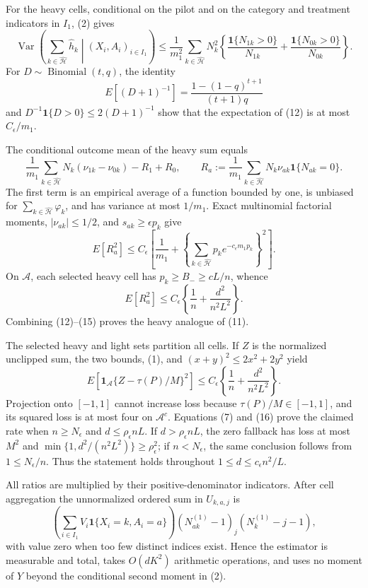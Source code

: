 For the heavy cells, conditional on the pilot and on the category and treatment indicators in \(I_1\), (2) gives
\[
 \operatorname{Var}\left(\sum_{k\in\widehat{\mathcal H}}\widehat h_k
 \middle|(X_i,A_i)_{i\in I_1}\right)
 \le\frac1{m_1^2}\sum_{k\in\widehat{\mathcal H}}N_k^2
 \left\{\frac{\mathbf1\{N_{1k}>0\}}{N_{1k}}+
 \frac{\mathbf1\{N_{0k}>0\}}{N_{0k}}\right\}.
\tag{12}
\]
For \(D\sim\operatorname{Binomial}(t,q)\), the identity
\[
 E[(D+1)^{-1}]=\frac{1-(1-q)^{t+1}}{(t+1)q}
\]
and \(D^{-1}\mathbf1\{D>0\}\le2(D+1)^{-1}\) show that the expectation of (12) is at most \(C_\epsilon/m_1\).

The conditional outcome mean of the heavy sum equals
\[
 \frac1{m_1}\sum_{k\in\widehat{\mathcal H}}N_k(\nu_{1k}-\nu_{0k})-R_1+R_0,
 \qquad R_a:=\frac1{m_1}\sum_{k\in\widehat{\mathcal H}}N_k\nu_{ak}\mathbf1\{N_{ak}=0\}.
\tag{13}
\]
The first term is an empirical average of a function bounded by one, is unbiased for \(\sum_{k\in\widehat{\mathcal H}}\varphi_k\), and has variance at most \(1/m_1\).  Exact multinomial factorial moments, \(|\nu_{ak}|\le1/2\), and \(s_{ak}\ge\epsilon p_k\) give
\[
 E[R_a^2]\le C_\epsilon\left[\frac1{m_1}+
 \left\{\sum_{k\in\widehat{\mathcal H}}p_ke^{-c_\epsilon m_1p_k}\right\}^2\right].
\tag{14}
\]
On \(\mathcal A\), each selected heavy cell has \(p_k\ge B_-\ge cL/n\), whence
\[
 E[R_a^2]\le C_\epsilon\left\{\frac1n+\frac{d^2}{n^2L^2}\right\}.
\tag{15}
\]
Combining (12)--(15) proves the heavy analogue of (11).

The selected heavy and light sets partition all cells.  If \(Z\) is the normalized unclipped sum, the two bounds, (1), and \((x+y)^2\le2x^2+2y^2\) yield
\[
 E[\mathbf1_{\mathcal A}\{Z-\tau(P)/M\}^2]
 \le C_\epsilon\left\{\frac1n+\frac{d^2}{n^2L^2}\right\}.
\tag{16}
\]
Projection onto \([-1,1]\) cannot increase loss because \(\tau(P)/M\in[-1,1]\), and its squared loss is at most four on \(\mathcal A^c\).  Equations (7) and (16) prove the claimed rate when \(n\ge N_\epsilon\) and \(d\le\rho_\epsilon nL\).  If \(d>\rho_\epsilon nL\), the zero fallback has loss at most \(M^2\) and \(\min\{1,d^2/(n^2L^2)\}\ge\rho_\epsilon^2\); if \(n<N_\epsilon\), the same conclusion follows from \(1\le N_\epsilon/n\).  Thus the statement holds throughout \(1\le d\le c_\epsilon n^2/L\).

All ratios are multiplied by their positive-denominator indicators.  After cell aggregation the unnormalized ordered sum in \(U_{k,a,j}\) is
\[
 \left(\sum_{i\in I_1}V_i\mathbf1\{X_i=k,A_i=a\}\right)
 (N_{ak}^{(1)}-1)_j(N_k^{(1)}-j-1),
\]
with value zero when too few distinct indices exist.  Hence the estimator is measurable and total, takes \(O(dK^2)\) arithmetic operations, and uses no moment of \(Y\) beyond the conditional second moment in (2).